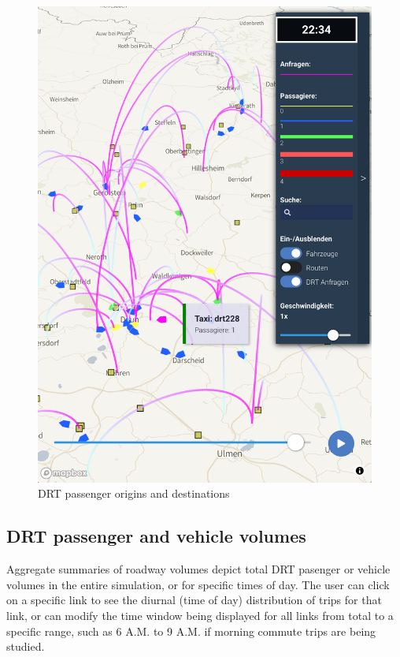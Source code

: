 \begin{figure}[ht]
\begin{minipage}[c]{0.45\textwidth}
   \includegraphics[width=\linewidth]{chapters/22-avov/images/fig-drt-flyovers.png}
   \caption{DRT passenger origins and destinations}
   \label{fig:avov-drt-od}
\end{minipage}
\end{figure}

\subsection{DRT passenger and vehicle volumes}
\label{avov-volumes}

Aggregate summaries of roadway volumes depict total DRT pasenger or vehicle volumes in the entire simulation, or for specific times of day. The user can click on a specific link to see the diurnal (time of day) distribution of trips for that link, or can modify the time window being displayed for all links from total to a specific range, such as 6 A.M. to 9 A.M. if morning commute trips are being studied.

